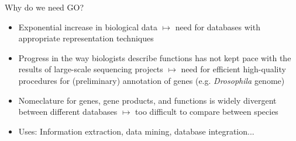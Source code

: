 \documentclass{beamer}
\begin{document}
\begin{frame}{Why do we need GO?}
\begin{itemize}
\item Exponential increase in biological data $\longmapsto$ need for databases with appropriate 
representation techniques
\item Progress in the way biologists describe functions has not kept pace with the results of 
large-scale sequencing projects $\longmapsto$ need for eff{}icient high-quality procedures for 
(preliminary) annotation of genes (e.g. \textit{Drosophila} genome)
\item Nomeclature for genes, gene products, and functions is widely divergent between dif{}ferent 
databases $\longmapsto$ too diff{}icult to compare between species

\item Uses: Information extraction, data mining, database integration...

\end{itemize}
\end{frame}

\end{document}
